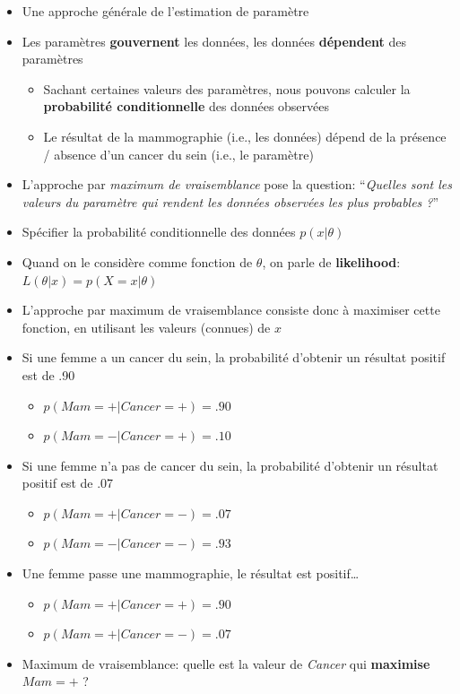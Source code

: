 \documentclass[
  a4paper,11pt,twoside,onecolumn,openright,final,oldfontcommands]{memoir}
\providecommand{\tightlist}{%
  \setlength{\itemsep}{0pt}\setlength{\parskip}{0pt}}
\theoremstyle{definition}
\theoremstyle{definition}
\theoremstyle{definition}
\theoremstyle{remark}
\begin{document}
\begin{itemize}
\item
  Une approche générale de l'estimation de paramètre
\item
  Les paramètres \textbf{gouvernent} les données, les données \textbf{dépendent} des paramètres

  \begin{itemize}
  \tightlist
  \item
    Sachant certaines valeurs des paramètres, nous pouvons calculer la \textbf{probabilité conditionnelle} des données observées
  \item
    Le résultat de la mammographie (i.e., les données) dépend de la présence / absence d'un cancer du sein (i.e., le paramètre)
  \end{itemize}
\item
  L'approche par \emph{maximum de vraisemblance} pose la question: ``\emph{Quelles sont les valeurs du paramètre qui rendent les données observées les plus probables ?}''
\item
  Spécifier la probabilité conditionnelle des données \(p(x|\theta)\)
\item
  Quand on le considère comme fonction de \(\theta\), on parle de \textbf{likelihood}: \(L(\theta|x) = p(X = x|\theta)\)
\item
  L'approche par maximum de vraisemblance consiste donc à maximiser cette fonction, en utilisant les valeurs (connues) de \(x\)
\item
  Si une femme a un cancer du sein, la probabilité d'obtenir un résultat positif est de .90

  \begin{itemize}
  \tightlist
  \item
    \(p(Mam=+|Cancer=+)=.90\)
  \item
    \(p(Mam=-|Cancer=+)=.10\)
  \end{itemize}
\item
  Si une femme n'a pas de cancer du sein, la probabilité d'obtenir un résultat positif est de .07

  \begin{itemize}
  \tightlist
  \item
    \(p(Mam=+|Cancer=-)=.07\)
  \item
    \(p(Mam=-|Cancer=-)=.93\)
  \end{itemize}
\item
  Une femme passe une mammographie, le résultat est positif\ldots{}

  \begin{itemize}
  \tightlist
  \item
    \(p(Mam=+|Cancer=+)=.90\)
  \item
    \(p(Mam=+|Cancer=-)=.07\)
  \end{itemize}
\item
  Maximum de vraisemblance: quelle est la valeur de \emph{Cancer} qui \textbf{maximise} \(Mam=+\) ?


\end{itemize}
\end{document}
